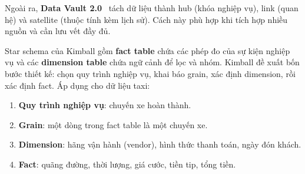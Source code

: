 \documentclass[12pt]{article}
\begin{document}
Ngoài ra, \textbf{Data Vault 2.0}~\cite{linstedt2015datavault} tách dữ liệu thành hub (khóa nghiệp vụ), link (quan hệ) và satellite (thuộc tính kèm lịch sử). Cách này phù hợp khi tích hợp nhiều nguồn và cần lưu vết đầy đủ.

Star schema của Kimball gồm \textbf{fact table} chứa các phép đo của sự kiện nghiệp vụ và các \textbf{dimension table} chứa ngữ cảnh để lọc và nhóm. Kimball đề xuất bốn bước thiết kế: chọn quy trình nghiệp vụ, khai báo grain, xác định dimension, rồi xác định fact. Áp dụng cho dữ liệu taxi:

\begin{enumerate}
    \item \textbf{Quy trình nghiệp vụ}: chuyến xe hoàn thành.
    \item \textbf{Grain}: một dòng trong fact table là một chuyến xe.
    \item \textbf{Dimension}: hãng vận hành (vendor), hình thức thanh toán, ngày đón khách.
    \item \textbf{Fact}: quãng đường, thời lượng, giá cước, tiền tip, tổng tiền.
\end{enumerate}
\end{document}
